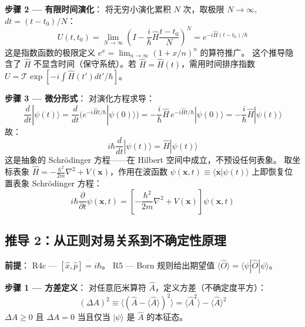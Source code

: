\textbf{步骤 2 — 有限时间演化}：\fbox{[S]} 将无穷小演化累积 $N$ 次，取极限 $N \to \infty$, $dt = (t-t_0)/N$：
\begin{equation}
U(t, t_0) = \lim_{N\to\infty} \left(I - \frac{i}{\hbar}\hat{H}\frac{t-t_0}{N}\right)^{\!N} = e^{-i\hat{H}(t-t_0)/\hbar}
\end{equation}
这是指数函数的极限定义 $e^x = \lim_{n\to\infty}(1 + x/n)^n$ 的算符推广。\fbox{[N]} 这个推导隐含了 $\hat{H}$ 不显含时间（保守系统）。若 $\hat{H} = \hat{H}(t)$，需用时间排序指数 $U = \mathcal{T}\exp[-i\int \hat{H}(t')dt'/\hbar]$。

\textbf{步骤 3 — 微分形式}：\fbox{[S]} 对演化方程求导：
\begin{equation}
\frac{d}{dt}|\psi(t)\rangle = \frac{d}{dt}\big(e^{-i\hat{H}t/\hbar}|\psi(0)\rangle\big)
= -\frac{i}{\hbar}\hat{H}\, e^{-i\hat{H}t/\hbar}|\psi(0)\rangle
= -\frac{i}{\hbar}\hat{H}|\psi(t)\rangle
\end{equation}
故：
\begin{equation}
\boxed{i\hbar\frac{d}{dt}|\psi(t)\rangle = \hat{H}|\psi(t)\rangle}
\end{equation}
\fbox{[S]} 这是抽象的 Schrödinger 方程——在 Hilbert 空间中成立，不预设任何表象。\fbox{[N]} 取坐标表象 $\hat{H} = -\frac{\hbar^2}{2m}\nabla^2 + V(\mathbf{x})$，作用在波函数 $\psi(\mathbf{x},t) \equiv \langle\mathbf{x}|\psi(t)\rangle$ 上即恢复位置表象 Schrödinger 方程：
\begin{equation}
i\hbar\frac{\partial}{\partial t}\psi(\mathbf{x},t) = \left[-\frac{\hbar^2}{2m}\nabla^2 + V(\mathbf{x})\right]\psi(\mathbf{x},t)
\end{equation}

\subsection{推导 2：从正则对易关系到不确定性原理}

\textbf{前提}：\fbox{[N]} R4c — $[\hat{x}, \hat{p}] = i\hbar$。\fbox{[N]} R5 — Born 规则给出期望值 $\langle\hat{O}\rangle = \langle\psi|\hat{O}|\psi\rangle$。

\textbf{步骤 1 — 方差定义}：\fbox{[S]} 对任意厄米算符 $\hat{A}$，定义方差（不确定度平方）：
\begin{equation}
(\Delta A)^2 \equiv \langle (\hat{A} - \langle\hat{A}\rangle)^2 \rangle
= \langle\hat{A}^2\rangle - \langle\hat{A}\rangle^2
\end{equation}
$\Delta A \ge 0$ 且 $\Delta A = 0$ 当且仅当 $|\psi\rangle$ 是 $\hat{A}$ 的本征态。

